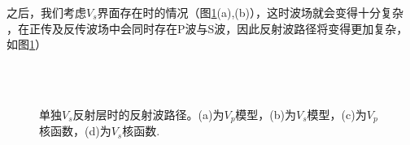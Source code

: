 之后，我们考虑$V_s$界面存在时的情况（图\ref{fig:kernel2}(a),(b)），这时波场就会变得十分复杂
，在正传及反传波场中会同时存在P波与S波，因此反射波路径将变得更加复杂，如图\ref{fig:kernel2}）
\begin{figure}
   \centering
   \\
   \\
   \caption{单独$V_s$反射层时的反射波路径。(a)为$V_p$模型，(b)为$V_s$模型，(c)为$V_p$核函数，(d)为$V_s$核函数.}
   \label{fig:kernel2}
\end{figure}
